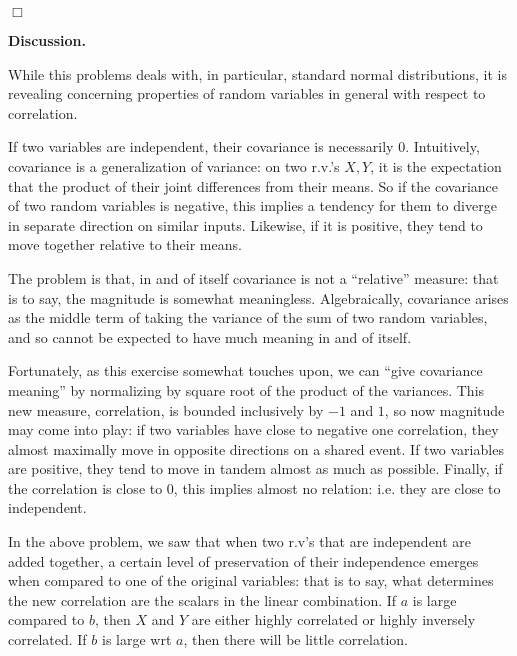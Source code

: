 \documentclass{article}
\begin{document}
\hfill $\Box$

\bigskip

\bigskip

\noindent \textbf{Discussion.} 

While this problems deals with, in particular, standard normal distributions, it is revealing concerning properties of random variables in general with respect to correlation. 

If two variables are independent, their covariance is necessarily 0. Intuitively, covariance is a generalization of variance: on two r.v.'s $X,Y$, it is the expectation that the product of their joint differences from their means. So if the covariance of two random variables is negative, this implies a tendency for them to diverge in separate direction on similar inputs. Likewise, if it is positive, they tend to move together relative to their means. 

The problem is that, in and of itself covariance is not a ``relative'' measure: that is to say, the magnitude is somewhat meaningless. Algebraically, covariance arises as the middle term of taking the variance of the sum of two random variables, and so cannot be expected to have much meaning in and of itself. 

Fortunately, as this exercise somewhat touches upon, we can ``give covariance meaning'' by normalizing by square root of the product of the variances. This new measure, correlation, is bounded inclusively by $-1$ and $1$, so now magnitude may come into play: if two variables have close to negative one correlation, they almost maximally move in opposite directions on a shared event. If two variables are positive, they tend to move in tandem almost as much as possible. Finally, if the correlation is close to 0, this implies almost no relation: i.e. they are close to independent. 

In the above problem, we saw that when two r.v's that are independent are added together, a certain level of preservation of their independence emerges when compared to one of the original variables: that is to say, what determines the new correlation are the scalars in the linear combination. If $a$ is large compared to $b$, then $X$ and $Y$ are either highly correlated or highly inversely correlated. If $b$ is large wrt $a$, then there will be little correlation. 
\end{document}
